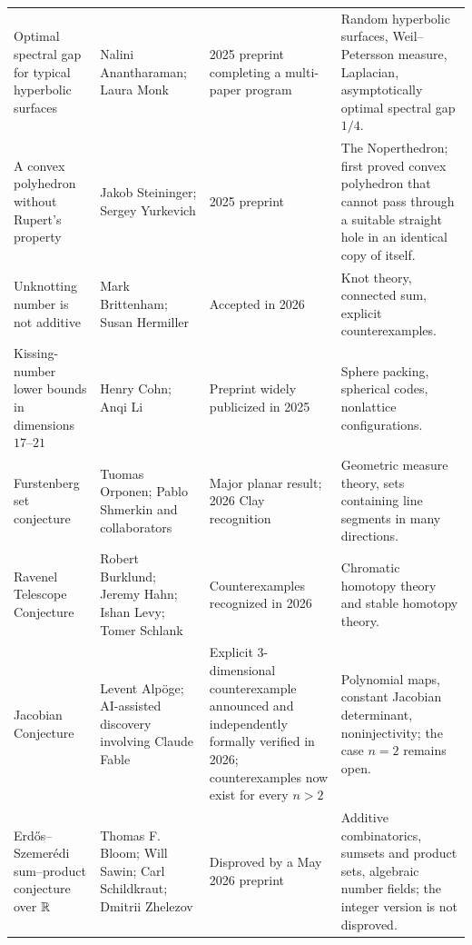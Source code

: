 {\begin{longtable}{@{}L{0.25\textwidth}L{0.22\textwidth}L{0.18\textwidth}L{0.27\textwidth}@{}}
        Optimal spectral gap for typical hyperbolic surfaces
        & Nalini Anantharaman; Laura Monk
        & 2025 preprint completing a multi-paper program
        & Random hyperbolic surfaces, Weil--Petersson measure, Laplacian,
          asymptotically optimal spectral gap $1/4$. \\

        A convex polyhedron without Rupert's property
        & Jakob Steininger; Sergey Yurkevich
        & 2025 preprint
        & The Noperthedron; first proved convex polyhedron that cannot pass
          through a suitable straight hole in an identical copy of itself. \\

        Unknotting number is not additive
        & Mark Brittenham; Susan Hermiller
        & Accepted in 2026
        & Knot theory, connected sum, explicit counterexamples. \\

        Kissing-number lower bounds in dimensions $17$--$21$
        & Henry Cohn; Anqi Li
        & Preprint widely publicized in 2025
        & Sphere packing, spherical codes, nonlattice configurations. \\

        Furstenberg set conjecture
        & Tuomas Orponen; Pablo Shmerkin and collaborators
        & Major planar result; 2026 Clay recognition
        & Geometric measure theory, sets containing line segments in many directions. \\

        Ravenel Telescope Conjecture
        & Robert Burklund; Jeremy Hahn; Ishan Levy; Tomer Schlank
        & Counterexamples recognized in 2026
        & Chromatic homotopy theory and stable homotopy theory. \\

        Jacobian Conjecture
        & Levent Alpöge; AI-assisted discovery involving Claude Fable
        & Explicit $3$-dimensional counterexample announced and independently
          formally verified in 2026; counterexamples now exist for every $n>2$
        & Polynomial maps, constant Jacobian determinant, noninjectivity; the
          case $n=2$ remains open. \\

        Erd\H{o}s--Szemer\'edi sum--product conjecture over $\mathbb{R}$
        & Thomas F. Bloom; Will Sawin; Carl Schildkraut; Dmitrii Zhelezov
        & Disproved by a May 2026 preprint
        & Additive combinatorics, sumsets and product sets, algebraic number
          fields; the integer version is not disproved. \\


\end{longtable}}
